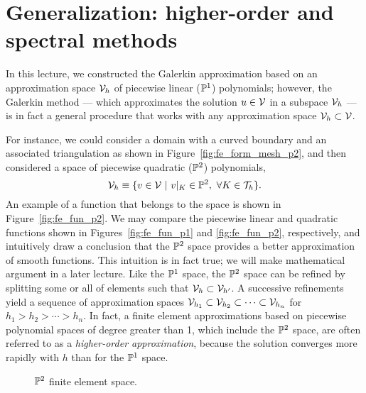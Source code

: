\section{Generalization: higher-order and spectral methods}
In this lecture, we constructed the Galerkin approximation based on an approximation space $\mathcal{V}_h$ of piecewise linear ($\mathbb{P}^1$) polynomials; however, the Galerkin method --- which approximates the solution $u \in \mathcal{V}$ in a subspace $\mathcal{V}_h$ --- is in fact a general procedure that works with any approximation space $\mathcal{V}_h \subset \mathcal{V}$.

For instance, we could consider a domain with a curved boundary and an associated triangulation as shown in Figure~\ref{fig:fe_form_mesh_p2}, and then considered a space of piecewise quadratic ($\mathbb{P}^2$) polynomials,
\begin{equation}
  \mathcal{V}_h \equiv \{ v \in \mathcal{V} \ | \ v|_K \in \mathbb{P}^2, \ \forall K \in \mathcal{T}_h \}.
  \label{eq:fe_form_Vh_p2}
\end{equation}
An example of a function that belongs to the space is shown in Figure~\ref{fig:fe_fun_p2}.  We may compare the piecewise linear and quadratic functions shown in Figures~\ref{fig:fe_fun_p1} and \ref{fig:fe_fun_p2}, respectively, and intuitively draw a conclusion that the $\mathbb{P}^2$ space provides a better approximation of smooth functions.  This intuition is in fact true; we will make mathematical argument in a later lecture. Like the $\mathbb{P}^1$ space, the $\mathbb{P}^2$ space can be refined by splitting some or all of elements such that $\mathcal{V}_h \subset \mathcal{V}_{h'}$. A successive refinements yield a sequence of approximation spaces $\mathcal{V}_{h_1} \subset \mathcal{V}_{h_2} \subset \dots \subset \mathcal{V}_{h_n}$ for $h_1 > h_2 > \cdots > h_n$. In fact, a finite element approximations based on piecewise polynomial spaces of degree greater than 1, which include the $\mathbb{P}^2$ space, are often referred to as a \emph{higher-order approximation}, because the solution converges more rapidly with $h$ than for the $\mathbb{P}^1$ space. 

\begin{figure}
  \centering
  \caption{$\mathbb{P}^2$ finite element space.}
\end{figure}


